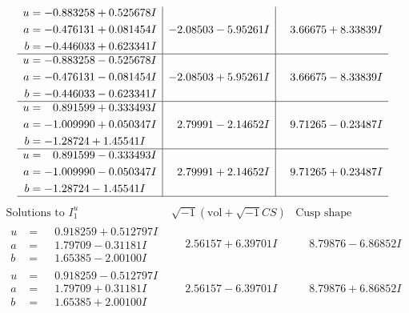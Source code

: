 \documentclass[1p]{elsarticle_modified}
\theoremstyle{definition}
\newcommand{\I}{\sqrt{-1}}
\begin{document}
$$\begin{array}{c|c|c}
\begin{aligned}
u &= -0.883258 + 0.525678 I \\
a &= -0.476131 + 0.081454 I \\
b &= -0.446033 + 0.623341 I\end{aligned}
 & -2.08503 - 5.95261 I & \phantom{-}3.66675 + 8.33839 I \\ \hline\begin{aligned}
u &= -0.883258 - 0.525678 I \\
a &= -0.476131 - 0.081454 I \\
b &= -0.446033 - 0.623341 I\end{aligned}
 & -2.08503 + 5.95261 I & \phantom{-}3.66675 - 8.33839 I \\ \hline\begin{aligned}
u &= \phantom{-}0.891599 + 0.333493 I \\
a &= -1.009990 + 0.050347 I \\
b &= -1.28724 + 1.45541 I\end{aligned}
 & \phantom{-}2.79991 - 2.14652 I & \phantom{-}9.71265 - 0.23487 I \\ \hline\begin{aligned}
u &= \phantom{-}0.891599 - 0.333493 I \\
a &= -1.009990 - 0.050347 I \\
b &= -1.28724 - 1.45541 I\end{aligned}
 & \phantom{-}2.79991 + 2.14652 I & \phantom{-}9.71265 + 0.23487 I\\
 \hline 
 \end{array}$$\newpage$$\begin{array}{c|c|c}  
\text{Solutions to }I^u_{1}& \I (\text{vol} + \sqrt{-1}CS) & \text{Cusp shape}\\
 \hline 
\begin{aligned}
u &= \phantom{-}0.918259 + 0.512797 I \\
a &= \phantom{-}1.79709 - 0.31181 I \\
b &= \phantom{-}1.65385 - 2.00100 I\end{aligned}
 & \phantom{-}2.56157 + 6.39701 I & \phantom{-}8.79876 - 6.86852 I \\ \hline\begin{aligned}
u &= \phantom{-}0.918259 - 0.512797 I \\
a &= \phantom{-}1.79709 + 0.31181 I \\
b &= \phantom{-}1.65385 + 2.00100 I\end{aligned}
 & \phantom{-}2.56157 - 6.39701 I & \phantom{-}8.79876 + 6.86852 I \\ \hline\begin{aligned}

\end{aligned}
\end{array}$$
\end{document}
